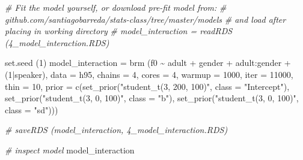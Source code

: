 \documentclass[
]{book}
\newenvironment{Shaded}{\begin{snugshade}}{\end{snugshade}}
\newcommand{\AttributeTok}[1]{\textcolor[rgb]{0.77,0.63,0.00}{#1}}
\newcommand{\CommentTok}[1]{\textcolor[rgb]{0.56,0.35,0.01}{\textit{#1}}}
\newcommand{\DecValTok}[1]{\textcolor[rgb]{0.00,0.00,0.81}{#1}}
\newcommand{\FunctionTok}[1]{\textcolor[rgb]{0.00,0.00,0.00}{#1}}
\newcommand{\NormalTok}[1]{#1}
\newcommand{\OtherTok}[1]{\textcolor[rgb]{0.56,0.35,0.01}{#1}}
\newcommand{\SpecialCharTok}[1]{\textcolor[rgb]{0.00,0.00,0.00}{#1}}
\newcommand{\StringTok}[1]{\textcolor[rgb]{0.31,0.60,0.02}{#1}}
\begin{document}
\begin{Shaded}
\begin{Highlighting}[]
\CommentTok{\# Fit the model yourself, or download pre{-}fit model from: }
\CommentTok{\# github.com/santiagobarreda/stats{-}class/tree/master/models}
\CommentTok{\# and load after placing in working directory}
\CommentTok{\#  model\_interaction = readRDS (\textquotesingle{}4\_model\_interaction.RDS\textquotesingle{})}

\FunctionTok{set.seed}\NormalTok{ (}\DecValTok{1}\NormalTok{)}
\NormalTok{model\_interaction }\OtherTok{=}  
  \FunctionTok{brm}\NormalTok{ (f0 }\SpecialCharTok{\textasciitilde{}}\NormalTok{ adult }\SpecialCharTok{+}\NormalTok{ gender }\SpecialCharTok{+}\NormalTok{ adult}\SpecialCharTok{:}\NormalTok{gender }\SpecialCharTok{+}\NormalTok{ (}\DecValTok{1}\SpecialCharTok{|}\NormalTok{speaker), }\AttributeTok{data =}\NormalTok{ h95, }
       \AttributeTok{chains =} \DecValTok{4}\NormalTok{, }\AttributeTok{cores =} \DecValTok{4}\NormalTok{, }\AttributeTok{warmup =} \DecValTok{1000}\NormalTok{, }\AttributeTok{iter =} \DecValTok{11000}\NormalTok{, }\AttributeTok{thin =} \DecValTok{10}\NormalTok{, }
       \AttributeTok{prior =} \FunctionTok{c}\NormalTok{(}\FunctionTok{set\_prior}\NormalTok{(}\StringTok{"student\_t(3, 200, 100)"}\NormalTok{, }\AttributeTok{class =} \StringTok{"Intercept"}\NormalTok{),}
                              \FunctionTok{set\_prior}\NormalTok{(}\StringTok{"student\_t(3, 0, 100)"}\NormalTok{, }\AttributeTok{class =} \StringTok{"b"}\NormalTok{),}
                              \FunctionTok{set\_prior}\NormalTok{(}\StringTok{"student\_t(3, 0, 100)"}\NormalTok{, }\AttributeTok{class =} \StringTok{"sd"}\NormalTok{))) }

\CommentTok{\#  saveRDS (model\_interaction, \textquotesingle{}4\_model\_interaction.RDS\textquotesingle{})}
\end{Highlighting}
\end{Shaded}

\begin{Shaded}
\begin{Highlighting}[]
\CommentTok{\# inspect model}
\NormalTok{model\_interaction}
\end{Highlighting}
\end{Shaded}
\end{document}
